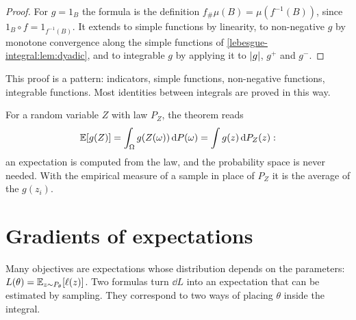 \begin{notechapter}
\begin{proof}
For $g = 1_B$ the formula is the definition
$f_\#\mu(B) = \mu(f^{-1}(B))$, since
$1_B\circ f = 1_{f^{-1}(B)}$. It extends to simple functions by
linearity, to non-negative $g$ by monotone convergence along the simple
functions of \cref{lebesgue-integral:lem:dyadic}, and to integrable $g$
by applying it to $\left|g\right|$, $g^+$ and $g^-$.
\end{proof}

This proof is a pattern: indicators, simple functions, non-negative
functions, integrable functions. Most identities between integrals are
proved in this way.

For a random variable $Z$ with law $P_Z$, the theorem reads
\[
  \mathbb{E}[g(Z)] = \int_\Omega g(Z(\omega))\,\mathrm{d} P(\omega)
  = \int g(z)\,\mathrm{d} P_Z(z) :
\]
an expectation is computed from the law, and the probability space is
never needed. With the empirical measure of a sample in place of $P_Z$
it is the average of the $g(z_i)$.

\section{Gradients of expectations}\label{lebesgue-integral:sec:ml}

Many objectives are expectations whose distribution depends on the
parameters: $L(\theta) = \mathbb{E}_{z\sim P_\theta}[\ell(z)]$. Two formulas
turn $\dd L$ into an expectation that can be estimated by sampling.
They correspond to two ways of placing $\theta$ inside the integral.


\end{notechapter}
